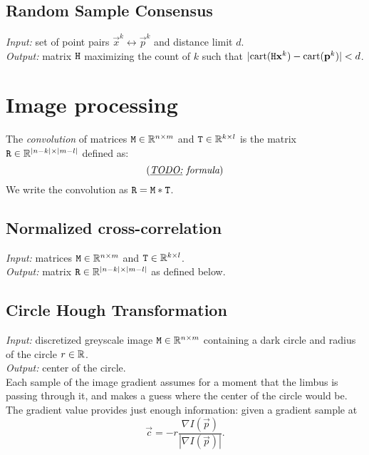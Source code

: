 \subsection{Random Sample Consensus}

\textit{Input:} set of point pairs $\vec x^k \leftrightarrow \vec p^k$ and distance limit $d$.\\
\textit{Output:} matrix $\mathtt{H}$ maximizing the count of $k$ such that $|\mathrm{cart}(\mathtt{H} \mathbf{x}^k) - \mathrm{cart}(\mathbf{p}^k)| < d$.\\

\cite[p.117]{hartley03}

\section{Image processing}

\begin{definition}
The \textit{convolution} of matrices $\mathtt{M} \in \mathbb{R}^{n \times m}$ and $\mathtt{T} \in \mathbb{R}^{k \times l}$ is the matrix $\mathtt{R} \in \mathbb{R}^{|n-k| \times |m - l|}$ defined as:
$$(\textit{\underline{TODO:} formula})
$$
We write the convolution as $\mathtt{R} = \mathtt{M} \ast \mathtt{T}$.
\end{definition}

\subsection{Normalized cross-correlation}

\textit{Input:} matrices $\mathtt{M} \in \mathbb{R}^{n \times m}$ and $\mathtt{T} \in \mathbb{R}^{k \times l}$.\\
\textit{Output:} matrix $\mathtt{R} \in \mathbb{R}^{|n-k| \times |m - l|}$ as defined below.\\


\subsection{Circle Hough Transformation}
\label{s:algo-hough}

\textit{Input:} discretized greyscale image $\mathtt{M} \in \mathbb{R}^{n \times m}$ containing a dark circle and radius of the circle $r \in \mathbb{R}$.\\
\textit{Output:} center of the circle.\\

Each sample of the image gradient assumes for a moment that the limbus is passing through it, and makes a guess where the center of the circle would be.
The gradient value provides just enough information: given a gradient sample at 
$$\vec c = -r \frac {\nabla I(\vec p)} {|\nabla I(\vec p)|}.$$

